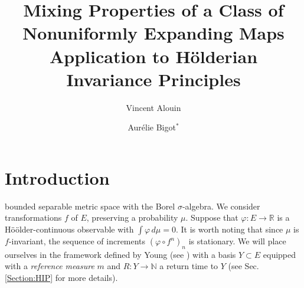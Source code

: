 \documentclass{ws-sd}
\title{Mixing Properties of a Class of Nonuniformly Expanding Maps Application to H\"olderian Invariance Principles}
\date{ }
\author{Vincent Alouin}
\author{Aur\'elie Bigot$^{\ast}$}
\newcommand{\R}{\mathbb{R}}
\begin{document}
\maketitle

{\let\thefootnote\relax{}}

\begin{history}
\end{history}



\section{Introduction}
    \label{Section:intro}

bounded separable metric space with the Borel $\sigma$-algebra. We consider transformations $f$ of $E$, preserving a probability $\mu$. Suppose that $\varphi : E \to \R$ is a Hö\"older-continuous observable with $\int \varphi \, d\mu = 0$. It is worth noting that since $\mu$ is $f$-invariant, the sequence of increments $(\varphi \circ f^n)_n$ is stationary. We will place ourselves in the framework defined by Young (see \cite{27}) with  a basis $Y \subset E$ equipped with a \textit{reference measure} $m$ and $R : Y \to \mathbb N$ a return time to $Y$ (see Sec. \ref{Section:HIP} for more details).
\\
\end{document}
